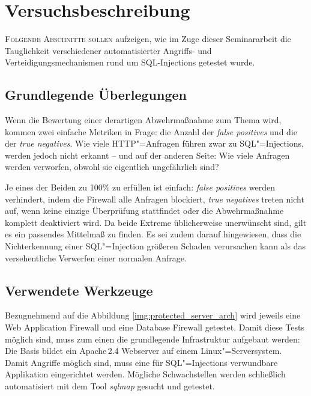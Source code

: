 \chapter{Versuchsbeschreibung}

\lettrine{F}{olgende Abschnitte sollen} aufzeigen, wie im Zuge dieser Seminararbeit die Tauglichkeit verschiedener automatisierter Angriffs- und Verteidigungsmechanismen rund um SQL-Injections getestet wurde.

\section{Grundlegende Überlegungen}

Wenn die Bewertung einer derartigen Abwehrmaßnahme zum Thema wird, kommen zwei einfache Metriken in Frage: die Anzahl der \emph{false positives} und die der \emph{true negatives}. Wie viele HTTP"=Anfragen führen zwar zu SQL"=Injections, werden jedoch nicht erkannt -- und auf der anderen Seite: Wie viele Anfragen werden verworfen, obwohl sie eigentlich ungefährlich sind?

Je eines der Beiden zu 100\% zu erfüllen ist einfach: \emph{false positives} werden verhindert, indem die Firewall alle Anfragen blockiert, \emph{true negatives} treten nicht auf, wenn keine einzige Überprüfung stattfindet oder die Abwehrmaßnahme komplett deaktiviert wird. Da beide Extreme üblicherweise unerwünscht sind, gilt es ein passendes Mittelmaß zu finden. Es sei zudem darauf hingewiesen, dass die Nichterkennung einer SQL"=Injection größeren Schaden verursachen kann als das versehentliche Verwerfen einer normalen Anfrage.

\section{Verwendete Werkzeuge}

Bezugnehmend auf die Abbildung \ref{img:protected_server_arch} wird jeweils eine Web Application Firewall und eine Database Firewall getestet. Damit diese Tests möglich sind, muss zum einen die grundlegende Infrastruktur aufgebaut werden: Die Basis bildet ein Apache\,2.4 Webserver auf einem Linux"=Serversystem. Damit Angriffe möglich sind, muss eine für SQL"=Injections verwundbare Applikation eingerichtet werden. Mögliche Schwachstellen werden schließlich automatisiert mit dem Tool \emph{sqlmap} gesucht und getestet.

